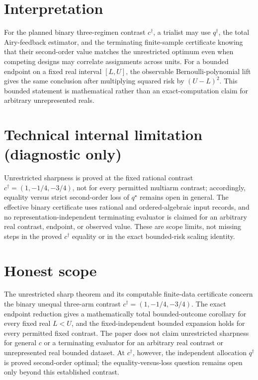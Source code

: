 \documentclass{article}
\begin{document}
{\section{Interpretation}

For the planned binary three-regimen contrast \(c^\dagger\), a trialist may use \(q^\dagger\), the total Airy-feedback estimator, and the terminating finite-sample certificate knowing that their second-order value matches the unrestricted optimum even when competing designs may correlate assignments across units. For a bounded endpoint on a fixed real interval \([L,U]\), the observable Bernoulli-polynomial lift gives the same conclusion after multiplying squared risk by \((U-L)^2\). This bounded statement is mathematical rather than an exact-computation claim for arbitrary unrepresented reals.

\section*{Technical internal limitation (diagnostic only)}

Unrestricted sharpness is proved at the fixed rational contrast \(c^\dagger=(1,-1/4,-3/4)\), not for every permitted multiarm contrast; accordingly, equality versus strict second-order loss of \(q^\star\) remains open in general. The effective binary certificate uses rational and ordered-algebraic input records, and no representation-independent terminating evaluator is claimed for an arbitrary real contrast, endpoint, or observed value. These are scope limits, not missing steps in the proved \(c^\dagger\) equality or in the exact bounded-risk scaling identity.

\section{Honest scope}

The unrestricted sharp theorem and its computable finite-data certificate concern the binary unequal three-arm contrast \(c^\dagger=(1,-1/4,-3/4)\). The exact endpoint reduction gives a mathematically total bounded-outcome corollary for every fixed real \(L<U\), and the fixed-independent bounded expansion holds for every permitted fixed contrast. The paper does not claim unrestricted sharpness for general \(c\) or a terminating evaluator for an arbitrary real contrast or unrepresented real bounded dataset. At \(c^\dagger\), however, the independent allocation \(q^\dagger\) is proved second-order optimal; the equality-versus-loss question remains open only beyond this established contrast.

}
\end{document}
